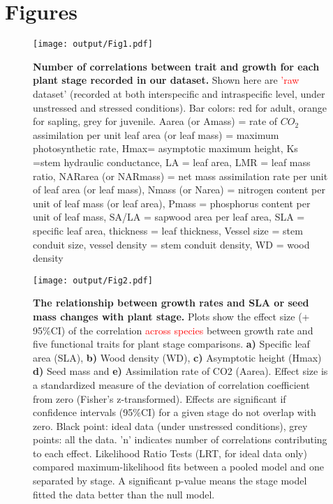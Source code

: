 \documentclass[a4paper]{article}\usepackage[]{graphicx}\usepackage[]{color}
\begin{document}
\clearpage
\linespread{1}

\nocite{*}
 
\label{references}


\newpage
\section*{Figures}

\begin{figure}[htbp]
\centering
\texttt{[image: output/Fig1.pdf]}
\caption{\textbf{Number of correlations between trait and growth for each plant stage recorded in our dataset.} Shown here are \textcolor{red}{'raw} dataset' (recorded at both interspecific and intraspecific level, under unstressed and stressed conditions). Bar colors: red for adult, orange for sapling, grey for juvenile. Aarea (or Amass) = rate of $CO_{2}$ assimilation per unit leaf area (or leaf mass) = maximum photosynthetic rate, Hmax= asymptotic maximum height,  Ks =stem hydraulic conductance, LA = leaf area, LMR = leaf mass ratio, NARarea (or NARmass) = net mass assimilation rate per unit of leaf area (or leaf mass), Nmass (or Narea) = nitrogen content per unit of leaf mass (or leaf area), Pmass = phosphorus content per unit of leaf mass, SA/LA = sapwood area per leaf area, SLA = specific leaf area, thickness = leaf thickness, Vessel size = stem conduit size, vessel density = stem conduit density, WD = wood density}
\label{Fig1}
\end{figure}


\begin{figure}[htbp]
\centering
\texttt{[image: output/Fig2.pdf]}
\caption{\textbf{The relationship between growth rates and SLA or seed mass changes with plant stage.} Plots show the effect size (+ 95\%CI) of the correlation \textcolor{red}{across species} between growth rate and five functional traits for plant stage comparisons. \textbf{a)} Specific leaf area (SLA), \textbf{b)} Wood density (WD), \textbf{c)} Asymptotic height (Hmax) \textbf{d)} Seed mass and \textbf{e)} Assimilation rate of CO2 (Aarea). Effect size is a standardized measure of the deviation of correlation coefficient from zero (Fisher's z-transformed). Effects are significant if confidence intervals (95\%CI) for a given stage do not overlap with zero. Black point: ideal data (under unstressed conditions), grey points: all the data. 'n' indicates number of correlations contributing to each effect. Likelihood Ratio Tests (LRT, for ideal data only) compared maximum-likelihood fits between a pooled model and one separated by stage. A significant p-value means the stage model fitted the data better than the null model.
}
\label{Fig2}
\end{figure}
\end{document}
